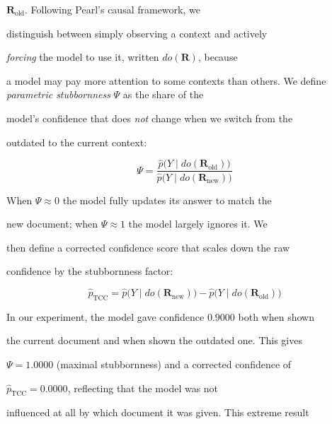 \documentclass[10pt,twoside]{article}
\numberwithin{equation}{section}
\begin{document}
$\mathbf{R}_{\mathrm{old}}$. Following Pearl's causal framework, we

distinguish between simply observing a context and actively

\emph{forcing} the model to use it, written $do(\mathbf{R})$, because

a model may pay more attention to some contexts than others. We define \emph{parametric stubbornness} $\Psi$ as the share of the

model's confidence that does \emph{not} change when we switch from the

outdated to the current context:

\begin{equation}

  \Psi = \frac{\hat{p}\bigl(Y\mid do(\mathbf{R}_{\mathrm{old}})\bigr)}

       {\hat{p}\bigl(Y\mid do(\mathbf{R}_{\mathrm{new}})\bigr)}

  \label{eq:stubbornness}

\end{equation}

When $\Psi \approx 0$ the model fully updates its answer to match the

new document; when $\Psi \approx 1$ the model largely ignores it. We

then define a corrected confidence score that scales down the raw

confidence by the stubbornness factor:

\begin{equation}

  \hat{p}_{\mathrm{TCC}}

  = \hat{p}\bigl(Y\mid do(\mathbf{R}_{\mathrm{new}})\bigr)

    - \hat{p}\bigl(Y\mid do(\mathbf{R}_{\mathrm{old}})\bigr)

  \label{eq:safe_conf}

\end{equation}

In our experiment, the model gave confidence $0.9000$ both when shown

the current document and when shown the outdated one. This gives

$\Psi = 1.0000$ (maximal stubbornness) and a corrected confidence of

$\hat{p}_{\mathrm{TCC}} = 0.0000$, reflecting that the model was not

influenced at all by which document it was given. This extreme result
\end{document}
